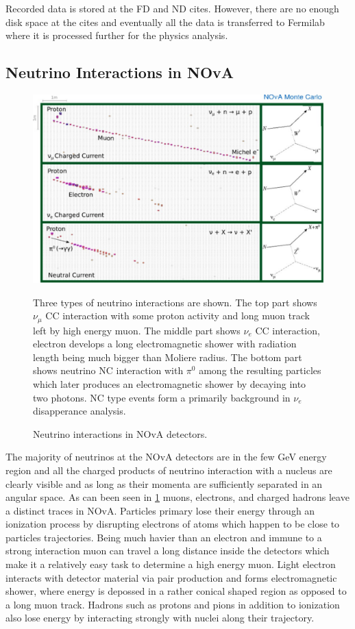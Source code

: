 Recorded data is stored at the FD and ND cites. However, there are no enough disk space at the cites and
eventually all the data is transferred to Fermilab where it is processed further for the physics analysis.

\subsection{Neutrino Interactions in NOvA}
\begin{figure}
\includegraphics[width=1.0\textwidth]{figures/Det_topologies.pdf}\\%
\caption{Neutrino interactions in NOvA detectors.}
{Three types of neutrino interactions are shown. The top part shows $\nu_\mu$ CC interaction with some
proton activity and long muon track left by high energy muon. The middle part shows $\nu_e$ CC interaction,
electron develops a long electromagnetic shower with radiation length being much bigger than Moliere radius.
The bottom part shows neutrino NC interaction with $\pi^0$ among the resulting particles which later produces
an electromagnetic shower by decaying into two photons. NC type events form a primarily background in $\nu_e$
disapperance analysis.} \label{fig:Topologies}
\end{figure}
The majority of neutrinos at the NOvA detectors are in the few GeV energy region and all the charged 
products of neutrino interaction with a nucleus are clearly visible and as long as their momenta are 
sufficiently separated in an angular space. As can been seen in \ref{fig:Topologies} muons, electrons, 
and charged hadrons leave a distinct traces in NOvA. Particles primary lose their energy through an ionization 
process by disrupting electrons of atoms which happen to be close to particles trajectories. Being 
much havier than an electron and immune to a strong interaction muon can travel a long distance inside 
the detectors which make it a relatively easy task to determine a high energy muon. Light electron interacts
with detector material via pair production and forms electromagnetic shower, where energy is depossed in 
a rather conical shaped region as opposed to a long muon track. Hadrons such as protons and pions in 
addition to ionization also lose energy by interacting strongly with nuclei along their trajectory. 

